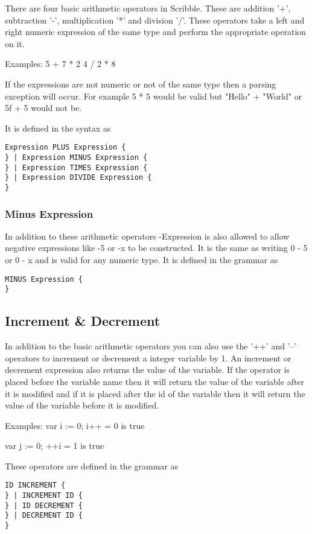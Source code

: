 \documentclass[]{final_report}
\begin{document}
There are four basic arithmetic operators in Scribble. These are addition '+', subtraction '-', multiplication '*' and division '/'. These operators take a left and right numeric expression of the same type and perform the appropriate operation on it.

Examples: 
5 + 7 * 2
4 / 2 * 8

If the expressions are not numeric or not of the same type then a parsing exception will occur. For example 5 * 5 would be valid but "Hello" + "World" or 5f + 5 would not be.

It is defined in the syntax as
\begin{verbatim}
Expression PLUS Expression {
} | Expression MINUS Expression {
} | Expression TIMES Expression {
} | Expression DIVIDE Expression {
}
\end{verbatim}

\subsubsection{Minus Expression}

In addition to these arithmetic operators -Expression is also allowed to allow negative expressions like -5 or -x to be constructed. It is the same as writing 0 - 5 or 0 - x and is valid for any numeric type. It is defined in the grammar as 

\begin{verbatim}
MINUS Expression {
}
\end{verbatim}

\subsection{Increment \& Decrement}

In addition to the basic arithmetic operators you can also use the '++' and '--' operators to increment or decrement a integer variable by 1. An increment or decrement expression also returns the value of the variable. If the operator is placed before the variable name then it will return the value of the variable after it is modified and if it is placed after the id of the variable then it will return the value of the variable before it is modified.

Examples:
var i := 0;
i++ = 0 is true

var j := 0;
++i = 1 is true

These operators are defined in the grammar as
\begin{verbatim}
ID INCREMENT {
} | INCREMENT ID {
} | ID DECREMENT {
} | DECREMENT ID {
}
\end{verbatim}
\end{document}
